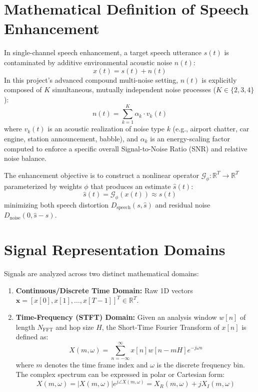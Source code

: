 \documentclass[11pt,a4paper]{report}
\begin{document}
\section{Mathematical Definition of Speech Enhancement}
In single-channel speech enhancement, a target speech utterance $s(t)$ is contaminated by additive environmental acoustic noise $n(t)$:
\begin{equation}
    x(t) = s(t) + n(t)
    \label{eq:enhancement_mixture}
\end{equation}
In this project's advanced compound multi-noise setting, $n(t)$ is explicitly composed of $K$ simultaneous, mutually independent noise processes ($K \in \{2, 3, 4\}$):
\begin{equation}
    n(t) = \sum_{k=1}^K \alpha_k \cdot v_k(t)
    \label{eq:compound_noise}
\end{equation}
where $v_k(t)$ is an acoustic realization of noise type $k$ (e.g., airport chatter, car engine, station announcement, babble), and $\alpha_k$ is an energy-scaling factor computed to enforce a specific overall Signal-to-Noise Ratio (SNR) and relative noise balance.

The enhancement objective is to construct a nonlinear operator $\mathcal{G}_\phi: \mathbb{R}^T \rightarrow \mathbb{R}^T$ parameterized by weights $\phi$ that produces an estimate $\hat{s}(t)$:
\begin{equation}
    \hat{s}(t) = \mathcal{G}_\phi(x(t)) \approx s(t)
\end{equation}
minimizing both speech distortion $D_{\text{speech}}(s, \hat{s})$ and residual noise $D_{\text{noise}}(0, \hat{s} - s)$.

\section{Signal Representation Domains}
Signals are analyzed across two distinct mathematical domains:
\begin{enumerate}
    \item \textbf{Continuous/Discrete Time Domain:} Raw 1D vectors $\mathbf{x} = [x[0], x[1], \dots, x[T-1]]^T \in \mathbb{R}^T$.
    \item \textbf{Time-Frequency (STFT) Domain:} Given an analysis window $w[n]$ of length $N_{\text{FFT}}$ and hop size $H$, the Short-Time Fourier Transform of $x[n]$ is defined as:
    \begin{equation}
        X(m, \omega) = \sum_{n=-\infty}^{\infty} x[n] w[n - mH] e^{-j \omega n}
        \label{eq:stft_def}
    \end{equation}
    where $m$ denotes the time frame index and $\omega$ is the discrete frequency bin. The complex spectrum can be expressed in polar or Cartesian form:
    \begin{equation}
        X(m, \omega) = |X(m, \omega)| e^{j \angle X(m, \omega)} = X_R(m, \omega) + j X_I(m, \omega)
    \end{equation}
\end{enumerate}
\end{document}
